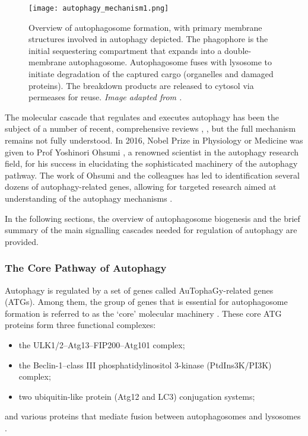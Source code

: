             \begin{figure}[!h]
            \centering
            \texttt{[image: autophagy\_mechanism1.png]}
            \caption[Overview of autophagosome formation]{Overview of autophagosome formation, with primary membrane structures involved in autophagy depicted. The phagophore is the initial sequestering compartment that expands into a double-membrane autophagosome. Autophagosome fuses with lysosome to initiate degradation of the captured cargo (organelles and damaged proteins). The breakdown products are released to cytosol via permeases for reuse. \textit{Image adapted from \cite{Feng2015}.} }
            \label{fig:autophagosome}
            \end{figure} 
            
    The molecular cascade that regulates and executes autophagy has been the subject of a number of recent, comprehensive reviews \cite{Feng2015, Abada2014}, \cite{ Fullgrabe2016, Kaur2015}, but the full mechanism remains not fully understood. In 2016, Nobel Prize in Physiology or Medicine was given to Prof Yoshinori Ohsumi \cite{The2016}, a renowned scientist in the autophagy research field, for his success in elucidating the sophisticated machinery of the autophagy pathway. The work of Ohsumi and the colleagues has led to identification several dozens of autophagy-related genes, allowing for targeted research aimed at understanding of the autophagy mechanisms \cite{Feng2015}. 

    In the following sections, the overview of autophagosome biogenesis and the brief summary of the main signalling cascades needed for regulation of autophagy are provided. 



        \subsubsection{The Core Pathway of Autophagy }
        
        
      Autophagy is regulated by a set of genes called AuTophaGy-related genes (ATGs). Among them, the group of genes that is essential for autophagosome formation is referred to as the ‘core’ molecular machinery \cite{Xie2007}. These core ATG proteins form three functional complexes:
      \begin{itemize}
          \item the ULK1/2--Atg13--FIP200--Atg101 complex; 
          \item the Beclin-1--class III phosphatidylinositol 3-kinase (PtdIns3K/PI3K) complex; 
          \item two ubiquitin-like protein (Atg12 and LC3) conjugation systems;
    \end{itemize}
    and various proteins that mediate fusion between autophagosomes and lysosomes \cite{Feng2015, Yang2010}. 


